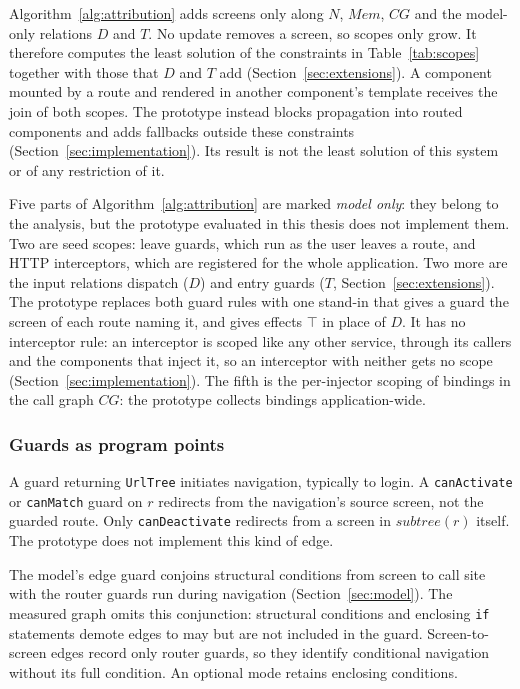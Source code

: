Algorithm~\ref{alg:attribution} adds screens only along $N$, $\mathit{Mem}$, $\mathit{CG}$ and the
model-only relations $D$ and $T$. No update removes a screen, so scopes only grow. It therefore computes the least solution of the constraints in Table~\ref{tab:scopes} together with those that $D$ and $T$ add (Section~\ref{sec:extensions}). A component mounted by a route and rendered in another component's template
receives the join of both scopes. The prototype instead blocks propagation into routed
components and adds fallbacks outside these constraints (Section~\ref{sec:implementation}).
Its result is not the least solution of this system or of any restriction of it.

Five parts of Algorithm~\ref{alg:attribution} are marked \emph{model only}: they belong to the
analysis, but the prototype evaluated in this thesis does not implement them. Two are seed scopes:
leave guards, which run as the user leaves a route, and HTTP interceptors, which are registered for
the whole application. Two more are the input relations dispatch ($D$) and entry guards ($T$,
Section~\ref{sec:extensions}). The prototype replaces both guard rules with one stand-in that gives
a guard the screen of each route naming it, and gives effects $\top$ in place of $D$. It has no
interceptor rule: an interceptor is scoped like any other service, through its callers and the
components that inject it, so an interceptor with neither gets no scope
(Section~\ref{sec:implementation}). The fifth is the per-injector scoping of bindings in the call
graph $\mathit{CG}$: the prototype collects bindings application-wide.



\subsubsection{Guards as program points}

A guard returning \texttt{UrlTree} initiates navigation, typically to login. A
\texttt{canActivate} or \texttt{canMatch} guard on $r$ redirects from the navigation's source
screen, not the guarded route. Only \texttt{canDeactivate} redirects from a screen in
$\mathit{subtree}(r)$ itself. The prototype does not implement this kind of edge.

The model's edge guard conjoins structural conditions from screen to call site with the
router guards run during navigation (Section~\ref{sec:model}). The measured graph omits
this conjunction: structural conditions and enclosing \texttt{if} statements demote edges
to may but are not included in the guard. Screen-to-screen edges record only router guards,
so they identify conditional navigation without its full condition. An optional mode retains
enclosing conditions.

